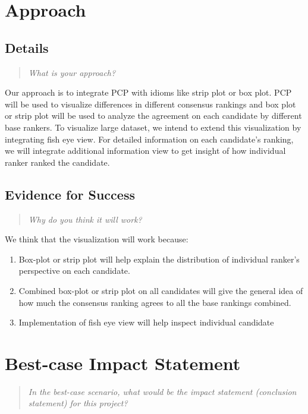 \documentclass{proc}
\begin{document}
\section{Approach}
\subsection{Details}
\begin{quote}
\textit{What is your approach?}
\end{quote}

Our approach is to integrate PCP with idioms like strip plot or box plot. PCP will be used to visualize differences in different consensus rankings and box plot or strip plot will be used to analyze the agreement on each candidate by different base rankers. To visualize large dataset, we intend to extend this visualization by integrating fish eye view. For detailed information on each candidate's ranking, we will integrate additional information view to get insight of how individual ranker ranked the candidate.

\subsection{Evidence for Success}
\begin{quote}
\textit{Why do you think it will work?} 
\end{quote}

We think that the visualization will work because:
\begin{enumerate}
  \item Box-plot or strip plot will help explain the distribution of individual ranker's perspective on each candidate.
  \item Combined box-plot or strip plot on all candidates will give the general idea of how much the consensus ranking agrees to all the base rankings combined.
  \item Implementation of fish eye view will help inspect individual candidate
\end{enumerate}

\section{Best-case Impact Statement}
\begin{quote}
\textit{In the best-case scenario, what would be the impact statement (conclusion statement) for this project? \cite{wijk2005value, pike2009science}}
\end{quote}
\end{document}
